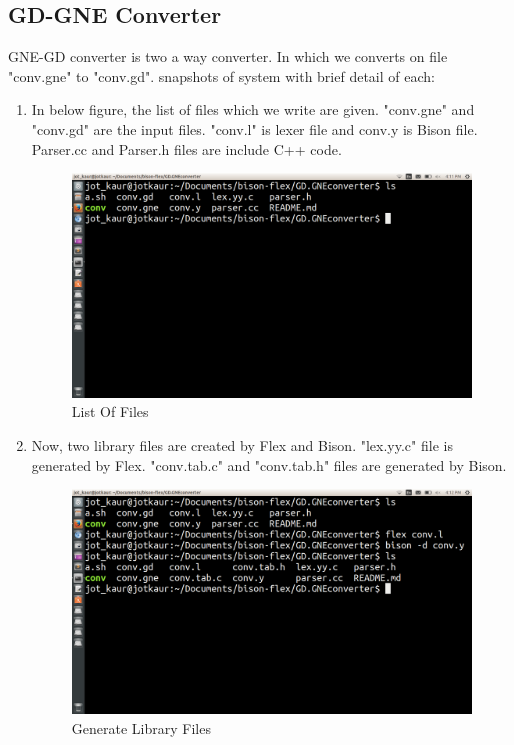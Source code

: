 \subsection{GD-GNE Converter}
GNE-GD converter is two a way converter. In which we converts on file "conv.gne" to "conv.gd". snapshots of system with brief detail of each:\\
\begin{enumerate}
\item In below figure, the list of files which we write are given. "conv.gne" and "conv.gd" are the input files. "conv.l" is lexer file and conv.y is Bison file. Parser.cc and Parser.h files are include C++ code.

\begin{figure} [h!]
\centering
\includegraphics[scale=0.2]{images/gnefiles.png}
\caption{List Of Files  }
\end{figure}

\item Now, two library files are created by Flex and Bison. "lex.yy.c" file is generated by Flex. "conv.tab.c" and "conv.tab.h" files are generated by Bison.
\begin{figure} [h!]
\centering
\includegraphics[scale=0.2]{images/gne2files.png}
\caption{Generate Library Files}
\end{figure}


\end{enumerate}
